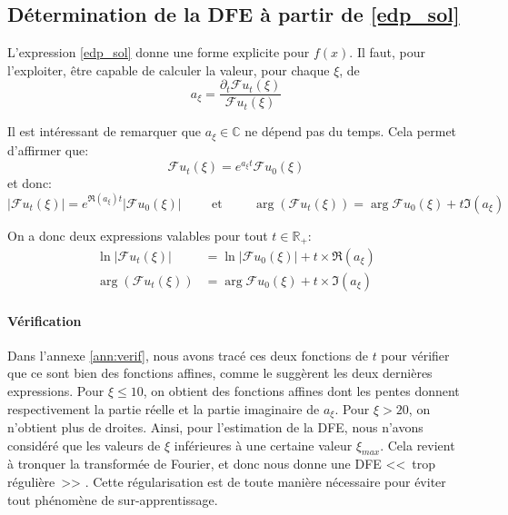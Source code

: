 \documentclass[12pt]{article}
\newcommand{\pth}[1]{\left(#1\right)}
\newcommand{\cro}[1]{\left[#1\right]}
\newcommand{\abs}[1]{\left|#1\right|}
\newcommand{\et}{\hspace{1cm}\text{et}\hspace{1cm}}
\newcommand{\ou}{\hspace{1cm}\text{ou}\hspace{1cm}}
\newcommand{\Ce}{\mathbb{C}}
\newcommand{\Er}{\mathbb{R}}
\newcommand{\Esp}[1]{\mathbb{E}\cro{#1}}
\newcommand{\dr}{\partial}
\newcommand{\fr}{\mathcal{F}}
\begin{document}
%
%
%


\subsection{Détermination de la DFE à partir de \eqref{edp_sol}\label{ss:det_dfe}}

L'expression \eqref{edp_sol} donne une forme explicite pour $f(x)$. Il faut, pour l'exploiter, être capable de calculer la valeur, pour chaque $\xi$, de
\[a_{\xi}=\frac{\dr_t\fr u_t(\xi)}{\fr u_t(\xi)}\]

Il est intéressant de remarquer que $a_{\xi}\in\Ce$ ne dépend pas du temps. Cela permet d'affirmer que:
\[\fr u_t(\xi)=e^{a_{\xi}t}\fr u_0(\xi)\] et donc:
\[\abs{\fr u_t(\xi)}=e^{\Re(a_{\xi})t}\abs{\fr u_0(\xi)} \et \arg\pth{\fr u_t(\xi)}=\arg{\fr u_0(\xi)}+t\Im(a_{\xi})\]

On a donc deux expressions valables pour tout $t\in \Er_+$:
\begin{align*}
  \ln\abs{\fr u_t(\xi)}&=\ln\abs{\fr u_0(\xi)}+t\times\Re(a_{\xi})\\
  \arg\pth{\fr u_t(\xi)}&=\arg{\fr u_0(\xi)}+t\times\Im(a_{\xi})
\end{align*}

\paragraph{Vérification} Dans l'annexe \ref{ann:verif}, nous avons tracé ces deux fonctions de $t$ pour vérifier que ce sont bien des fonctions affines, comme le suggèrent les deux dernières expressions. Pour $\xi\leqslant 10$, on obtient des fonctions affines dont les pentes donnent respectivement la partie réelle et la partie imaginaire de $a_{\xi}$. Pour $\xi>20$, on n'obtient plus de droites. Ainsi, pour l'estimation de la DFE, nous n'avons considéré que les valeurs de $\xi$ inférieures à une certaine valeur $\xi_{max}$. Cela revient à tronquer la transformée de Fourier, et donc nous donne une DFE <<~trop régulière~>> . Cette régularisation est de toute manière nécessaire pour éviter tout phénomène de sur-apprentissage.
\end{document}
